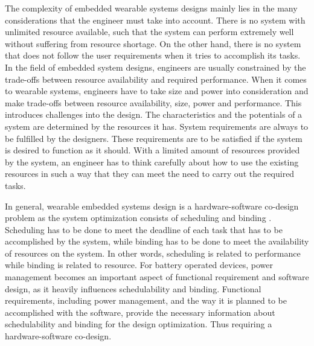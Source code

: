 The complexity of embedded wearable systems designs mainly lies in
the many considerations that the engineer must take into account.
There is no system with unlimited resource available, such that the
system can perform extremely well without suffering from resource
shortage. On the other hand, there is no system that does not follow
the user requirements when it tries to accomplish its tasks. In the
field of embedded system designs, engineers are usually constrained
by the trade-offs between resource availability and required
performance. When it comes to wearable systems, engineers have to
take size and power into consideration and make trade-offs between
resource availability, size, power and performance. This introduces
challenges into the design. The characteristics and the potentials of
a system are determined by the resources it has. System requirements
are always to be fulfilled by the designers.  These requirements are
to be satisfied if the system is desired to function as it should.
With a limited amount of resources provided by the system, an
engineer has to think carefully about how to use the existing
resources in such a way that they can meet the need to carry out
the required tasks. 

In general, wearable embedded systems design is a hardware-software
co-design problem as the system optimization consists of scheduling
and binding \cite{sched_bind}.  Scheduling has to be done to meet the
deadline of each task that has to be accomplished by the system,
while binding has to be done to meet the availability of resources on
the system. In other words, scheduling is related to performance
while binding is related to resource. For battery operated devices,
power management becomes an important aspect of functional
requirement and software design, as it heavily influences
schedulability and binding.  Functional requirements, including power
management, and the way it is planned to be accomplished with the
software, provide the necessary information about schedulability and
binding for the design optimization. Thus requiring a
hardware-software co-design.

